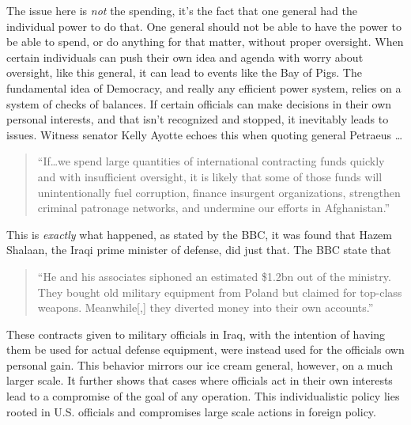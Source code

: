 \documentclass[12pt]{article}
\begin{document}
        The issue here is \textit{not} the spending, it's the fact that one general had the individual power to do that. One general should not be able to have the power to be able to spend, or do anything for that matter, without proper oversight. When certain individuals can push their own idea and agenda with worry about oversight, like this general, it can lead to events like the Bay of Pigs. The fundamental idea of Democracy, and really any efficient power system, relies on a system of checks of balances. If certain officials can make decisions in their own personal interests, and that isn't recognized and stopped, it inevitably leads to issues. Witness senator Kelly Ayotte echoes this when quoting general Petraeus \ldots

        \begin{quote}
            ``If\ldots we spend large quantities of international contracting funds quickly and with insufficient oversight, it is likely that some of those funds will unintentionally fuel corruption, finance insurgent organizations, strengthen criminal patronage networks, and undermine our efforts in Afghanistan.'' \parencite{us_senate2011wartime_contracting}
        \end{quote}

        This is \textit{exactly} what happened, as stated by the BBC, it was found that Hazem Shalaan, the Iraqi prime minister of defense, did just that. The BBC state that

        \begin{quote}
            ``He and his associates siphoned an estimated \$1.2bn out of the ministry. They bought old military equipment from Poland but claimed for top-class weapons. Meanwhile[,] they diverted money into their own accounts.'' \parencite{bbc2008iraqcontracts}
        \end{quote}

        These contracts given to military officials in Iraq, with the intention of having them be used for actual defense equipment, were instead used for the officials own personal gain. This behavior mirrors our ice cream general, however, on a much larger scale. It further shows that cases where officials act in their own interests lead to a compromise of the goal of any operation. This individualistic policy lies rooted in U.S. officials and compromises large scale actions in foreign policy.
        
\end{document}
